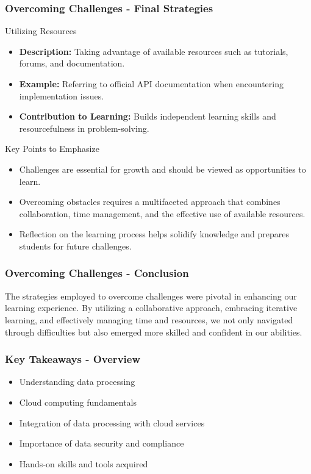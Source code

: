 \documentclass[aspectratio=169]{beamer}
\begin{document}
\begin{frame}[fragile]
    \frametitle{Overcoming Challenges - Final Strategies}
    \begin{block}{Utilizing Resources}
        \begin{itemize}
            \item \textbf{Description:} Taking advantage of available resources such as tutorials, forums, and documentation.
            \item \textbf{Example:} Referring to official API documentation when encountering implementation issues.
            \item \textbf{Contribution to Learning:} Builds independent learning skills and resourcefulness in problem-solving.
        \end{itemize}
    \end{block}

    \begin{block}{Key Points to Emphasize}
        \begin{itemize}
            \item Challenges are essential for growth and should be viewed as opportunities to learn.
            \item Overcoming obstacles requires a multifaceted approach that combines collaboration, time management, and the effective use of available resources.
            \item Reflection on the learning process helps solidify knowledge and prepares students for future challenges.
        \end{itemize}
    \end{block}
\end{frame}

\begin{frame}[fragile]
    \frametitle{Overcoming Challenges - Conclusion}
    The strategies employed to overcome challenges were pivotal in enhancing our learning experience. By utilizing a collaborative approach, embracing iterative learning, and effectively managing time and resources, we not only navigated through difficulties but also emerged more skilled and confident in our abilities.
\end{frame}

\begin{frame}[fragile]
    \frametitle{Key Takeaways - Overview}
    \begin{itemize}
        \item Understanding data processing
        \item Cloud computing fundamentals
        \item Integration of data processing with cloud services
        \item Importance of data security and compliance
        \item Hands-on skills and tools acquired
    \end{itemize}
\end{frame}
\end{document}
